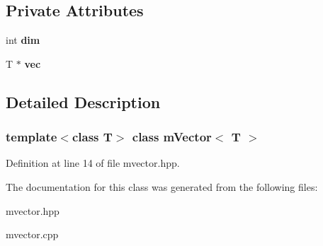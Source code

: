 \subsection*{Private Attributes}
\begin{DoxyCompactItemize}
\item 
\mbox{\label{classmVector_af3b73cb177df79ffc9c83dfdcf2b6712}} 
int {\bfseries dim}
\item 
\mbox{\label{classmVector_a36e1387719f9ddaa5b89755c5e6fa2e6}} 
T $\ast$ {\bfseries vec}
\end{DoxyCompactItemize}


\subsection{Detailed Description}
\subsubsection*{template$<$class T$>$\newline
class m\+Vector$<$ T $>$}



Definition at line 14 of file mvector.\+hpp.



The documentation for this class was generated from the following files\+:\begin{DoxyCompactItemize}
\item 
mvector.\+hpp\item 
mvector.\+cpp\end{DoxyCompactItemize}
